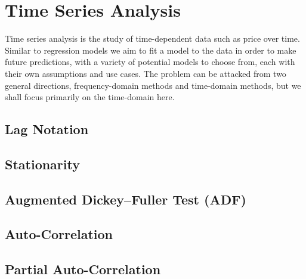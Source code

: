\section{Time Series Analysis}
\label{additional:time_series}

Time series analysis is the study of time-dependent data such as price over time.
Similar to regression models we aim to fit a model
to the data in order to make future predictions,
with a variety of potential models to choose from,
each with their own assumptions and use cases.
The problem can be attacked from two general directions,
frequency-domain methods and time-domain methods,
but we shall focus primarily on the time-domain here.

\subsection{Lag Notation}
\label{additional:time_series:L}

\subsection{Stationarity}
\label{additional:time_series:stationarity}

\subsection{Augmented Dickey--Fuller Test (ADF)}
\label{additional:time_series:ADF}

\subsection{Auto-Correlation}
\label{additional:time_series:auto_correlation}

\subsection{Partial Auto-Correlation}
\label{additional:time_series:partial_auto_correlation}

